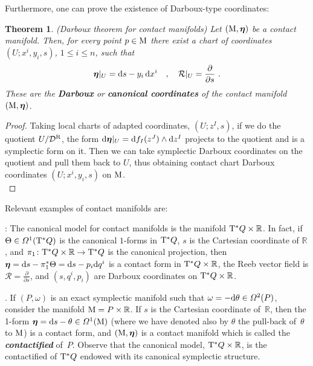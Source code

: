 \documentclass[12pt]{report}
\newtheorem{teor}{Theorem}[chapter]
\def\qed{\ifvmode\removelastskip\fi
{\unskip\nobreak\hfil\penalty50\hbox{}\nobreak\hfil
\hbox{\vrule height1.2ex width1.2ex}\parfillskip=0pt
\finalhyphendemerits=0 \par\smallskip}}
\def\df{{\mit\Omega}}
\def\d{{\rm d}}
\def\Real{\mathbb{R}}
\def\bmeta{\mbox{\boldmath $\eta$}}
\def\Tan{{\rm T}}
\newcommand{\Reeb}{\mathcal{R}}
\begin{document}
Furthermore, one can prove the existence of Darboux-type coordinates:

\begin{teor}
{\rm (Darboux theorem for contact manifolds)}
Let $({\rm M},\bmeta)$ be a contact manifold. 
Then, for every point $p\in {\rm M}$ there exist a chart of coordinates 
$(U; x^i, y_i, s)$, $1\leq i\leq n$, such that
\begin{equation*}
\bmeta\vert_U= \d s - y_i\,\d x^i 
\quad ,\quad
\Reeb\vert_U = \frac{\partial}{\partial s}\ .
\end{equation*}
These are the {\sl \textbf{Darboux}} or {\sl \textbf{canonical coordinates}} of the contact manifold $({\rm M},\bmeta)$.
\end{teor}
\begin{proof}
Taking local charts of adapted coordinates,
$(U;z^I,s)$, if we do the quotient $U/{\cal D}^{\rm R}$,
the form $\d\bmeta\vert_U=\d f_I(z^J)\wedge\d z^I$
projects to the quotient and is a symplectic form on it.
Then we can take symplectic Darboux coordinates on the quotient
and pull them back to $U$, thus obtaining contact chart Darboux coordinates $(U; x^i, y_i, s)$ on ${\rm M}$.
\\ \qed \end{proof}

Relevant examples of contact manifolds are:

:
The canonical model for contact manifolds
is the manifold $\Tan^*Q\times\Real$.
In fact, if $\Theta\in\df^1(\Tan^*Q)$ 
is the canonical $1$-forms in $\Tan^*Q$,
$s$ is the Cartesian coordinate of $\Real$, and 
$\pi_1\colon \Tan^*Q \times\Real \to \Tan^*Q$ 
is the canonical projection, then 
$\bmeta=\d s-\pi_1^*\Theta= \d s-p_i\d q^i$ is a contact form in  $\Tan^*Q\times\Real$,
the Reeb vector field is
$\displaystyle\Reeb=\frac{\partial}{\partial s}$, and $(s,q^i,p_i)$ are Darboux coordinates on $\Tan^*Q\times\Real$.

.
If $(P,\omega)$ is an exact symplectic manifold such that $\omega=-\d\theta\in\df^2(P)$,
consider the manifold ${\rm M} =P\times\Real$.
If $s$ is the Cartesian coordinate of~$\Real$,
then the 1-form
$\bmeta=\d s-\theta\in\df^1({\rm M})$
(where we have denoted also by $\theta$ the pull-back of~$\theta$ to ${\rm M}$) is a contact form,
and $({\rm M},\bmeta)$ is a contact manifold which is called the
{\sl\textbf{contactified}} of~$P$.
Observe that the canonical model, $\Tan^*Q\times\Real$,
is the contactified of $\Tan^*Q$ endowed with its canonical symplectic structure.
\end{document}
